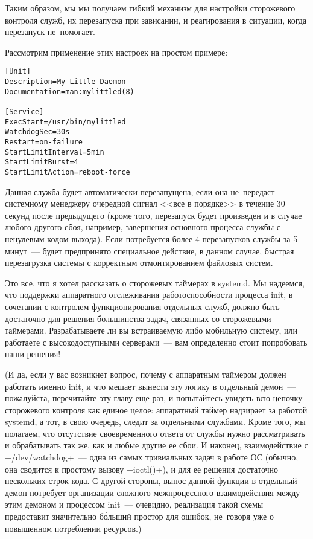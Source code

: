 \documentclass[10pt,oneside,a4paper]{article}
\begin{document}
Таким образом, мы мы получаем гибкий механизм для настройки сторожевого контроля
служб, их перезапуска при зависании, и реагирования в ситуации, когда перезапуск
не~помогает.

Рассмотрим применение этих настроек на простом примере:
\begin{Verbatim}
[Unit]
Description=My Little Daemon
Documentation=man:mylittled(8)

[Service]
ExecStart=/usr/bin/mylittled
WatchdogSec=30s
Restart=on-failure
StartLimitInterval=5min
StartLimitBurst=4
StartLimitAction=reboot-force
\end{Verbatim}
Данная служба будет автоматически перезапущена, если она не~передаст системному
менеджеру очередной сигнал <<все в порядке>> в течение 30 секунд после
предыдущего (кроме того, перезапуск будет произведен и в случае любого другого
сбоя, например, завершения основного процесса службы с ненулевым кодом выхода).
Если потребуется более 4 перезапусков службы за 5 минут~--- будет предпринято
специальное действие, в данном случае, быстрая перезагрузка системы с корректным
отмонтированием файловых систем.

Это все, что я хотел рассказать о сторожевых таймерах в systemd. Мы надеемся,
что поддержки аппаратного отслеживания работоспособности процесса init, в
сочетании с контролем функционирования отдельных служб, должно быть достаточно
для решения большинства задач, связанных со сторожевыми таймерами.
Разрабатываете ли вы встраиваемую либо мобильную систему, или работаете с
высокодоступными серверами~--- вам определенно стоит попробовать наши решения!

(И да, если у вас возникнет вопрос, почему с аппаратным таймером должен работать
именно init, и что мешает вынести эту логику в отдельный демон~--- пожалуйста,
перечитайте эту главу еще раз, и попытайтесь увидеть всю цепочку сторожевого
контроля как единое целое: аппаратный таймер надзирает за работой systemd, а
тот, в свою очередь, следит за отдельными службами. Кроме того, мы полагаем, что
отсутствие своевременного ответа от службы нужно рассматривать и обрабатывать
так же, как и любые другие ее сбои. И наконец, взаимодействие с
+/dev/watchdog+~--- одна из самых тривиальных задач в работе ОС (обычно, она
сводится к простому вызову +ioctl()+), и для ее решения достаточно нескольких
строк кода. С другой стороны, вынос данной функции в отдельный демон потребует
организации сложного межпроцессного взаимодействия между этим демоном и
процессом init~--- очевидно, реализация такой схемы предоставит значительно
б\'{о}льший простор для ошибок, не~говоря уже о повышенном потреблении
ресурсов.)
\end{document}
